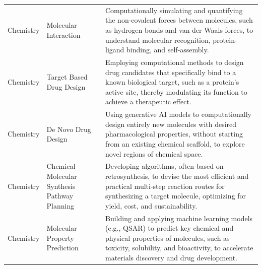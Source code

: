 \begin{longtable}{p{2cm}p{6cm}p{7cm}}
\rowcolor{ChemistryColor} Chemistry & Molecular Interaction & Computationally simulating and quantifying the non-covalent forces between molecules, such as hydrogen bonds and van der Waals forces, to understand molecular recognition, protein-ligand binding, and self-assembly. \\
\rowcolor{ChemistryColor} Chemistry & Target Based Drug Design & Employing computational methods to design drug candidates that specifically bind to a known biological target, such as a protein's active site, thereby modulating its function to achieve a therapeutic effect. \\
\rowcolor{ChemistryColor} Chemistry & De Novo Drug Design & Using generative AI models to computationally design entirely new molecules with desired pharmacological properties, without starting from an existing chemical scaffold, to explore novel regions of chemical space. \\
\rowcolor{ChemistryColor} Chemistry & Chemical Molecular Synthesis Pathway Planning & Developing algorithms, often based on retrosynthesis, to devise the most efficient and practical multi-step reaction routes for synthesizing a target molecule, optimizing for yield, cost, and sustainability. \\
\rowcolor{ChemistryColor} Chemistry & Molecular Property Prediction & Building and applying machine learning models (e.g., QSAR) to predict key chemical and physical properties of molecules, such as toxicity, solubility, and bioactivity, to accelerate materials discovery and drug development. \\


\end{longtable}
